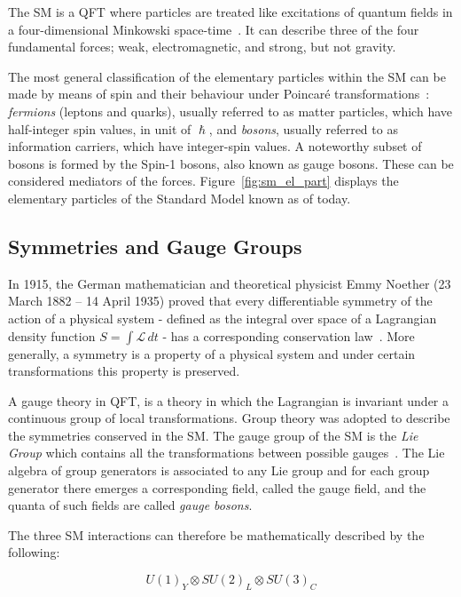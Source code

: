 		The \ac{SM} is a \ac{QFT} where particles are treated like excitations of quantum fields in a four-dimensional Minkowski space-time~\cite{Peskin1995}. It can describe three of the four fundamental forces; weak, electromagnetic, and strong, but not gravity.

		The most general classification of the elementary particles within the \ac{SM} can be made by means of spin and their behaviour under Poincaré transformations~\cite{Cottingham1998}: \textit{fermions} (leptons and quarks), usually referred to as matter particles, which have half-integer spin values, in unit of $\hslash$, and \textit{bosons}, usually referred to as information carriers, which have integer-spin values. A noteworthy subset of bosons is formed by the Spin-1 bosons, also known as gauge bosons. These can be considered mediators of the forces. Figure~\ref{fig:sm_el_part} displays the elementary particles of the Standard Model known as of today.



		\subsection*{Symmetries and Gauge Groups}

			In 1915, the German mathematician and theoretical physicist Emmy Noether (23 March 1882 – 14 April 1935) proved that every differentiable symmetry of the action of a physical system - defined as the integral over space of a Lagrangian density function $S = \int \mathcal{L}\, dt$ - has a corresponding conservation law~\cite{lederman2004symmetry}. More generally, a symmetry is a property of a physical system and under certain transformations this property is preserved. 

			A gauge theory in \ac{QFT}, is a theory in which the Lagrangian is invariant under a continuous group of local transformations. Group theory was adopted to describe the symmetries conserved in the \ac{SM}. The gauge group of the \ac{SM} is the \emph{Lie Group} which contains all the transformations between possible gauges~\cite{Cottingham1998}. The Lie algebra of group generators is associated to any Lie group and for each group generator there emerges a corresponding field, called the gauge field, and the quanta of such fields are called \emph{gauge bosons}.
			
			The three \ac{SM} interactions can therefore be mathematically described by the following:

			\begin{equation}
			\label{eq:SM_gaugeSym}
				U(1)_Y \otimes SU(2)_L \otimes SU(3)_C
			\end{equation}

